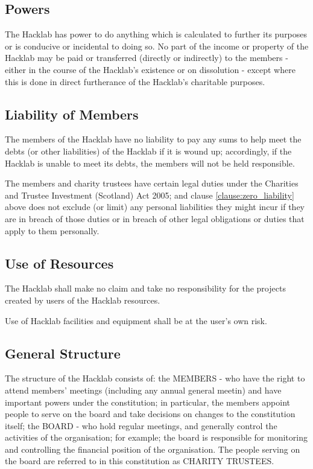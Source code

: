 \documentclass{article}
\begin{document}
\subsection{Powers}
\clause The Hacklab has power to do anything which is calculated to
further its purposes or is conducive or incidental to doing so.
\clause No part of the income or property of the Hacklab may be paid
or transferred (directly or indirectly) to the members - either in the
course of the Hacklab's existence or on dissolution - except where
this is done in direct furtherance of the Hacklab's charitable
purposes.
\subsection{Liability of Members}
\clause\label{clause:zero_liability} The members of the Hacklab have
no liability to pay any sums to help meet the debts (or other
liabilities) of the Hacklab if it is wound up; accordingly, if the
Hacklab is unable to meet its debts, the members will not be held
responsible.

\clause The members and charity trustees have certain legal duties
under the Charities and Trustee Investment (Scotland) Act 2005; and
clause \ref{clause:zero_liability} above does not exclude (or limit)
any personal liabilities they might incur if they are in breach of
those duties or in breach of other legal obligations or duties that
apply to them personally.
\cbend
\subsection{Use of Resources}

\clause The Hacklab shall make no claim and take no responsibility for
the projects created by users of the Hacklab resources.  

\clause Use of Hacklab facilities and equipment shall be at the user's
own risk.

\subsection{General Structure}
\cbstart
\clause The structure of the Hacklab consists of:
  \subclause the MEMBERS - who have the right to attend members'
  meetings (including any annual general meetin) and have important
  powers under the constitution; in particular, the members appoint
  people to serve on the board and take decisions on changes to the
  constitution itself;
  \subclause the BOARD - who hold regular meetings, and generally
  control the activities of the organisation; for example; the board
  is responsible for monitoring and controlling the financial position
  of the organisation.
\clause The people serving on the board are referred to in this
constitution as CHARITY TRUSTEES.
\cbend
\end{document}
